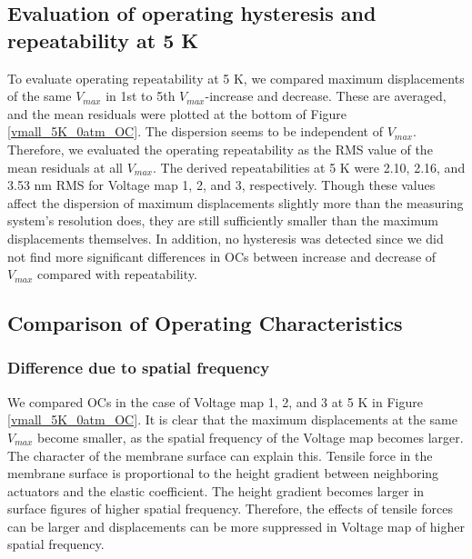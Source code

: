 \documentclass[a4paper]{article}
\begin{document}
\subsection{Evaluation of operating hysteresis and repeatability at 5 K}
\label{repeatability_estimate}
To evaluate operating repeatability at 5 K, we compared maximum displacements of the same $V_{max}$ in 1st to 5th $V_{max}$-increase and decrease. These are averaged, and the mean residuals were plotted at the bottom of Figure \ref{vmall_5K_0atm_OC}. The dispersion seems to be independent of $V_{max}$. Therefore, we evaluated the operating repeatability as the RMS value of the mean residuals at all $V_{max}$. The derived repeatabilities at 5 K were 2.10, 2.16, and 3.53 nm RMS for Voltage map 1, 2, and 3, respectively. Though these values affect the dispersion of maximum displacements slightly more than the measuring system's resolution does, they are still sufficiently smaller than the maximum displacements themselves. In addition, no hysteresis was detected since we did not find more significant differences in OCs between increase and decrease of $V_{max}$ compared with repeatability.

\subsection{Comparison of Operating Characteristics}

\subsubsection{Difference due to spatial frequency}
\label{spacial_frequency}
We compared OCs in the case of Voltage map 1, 2, and 3 at 5 K in Figure \ref{vmall_5K_0atm_OC}. It is clear that the maximum displacements at the same $V_{max}$ become smaller, as the spatial frequency of the Voltage map becomes larger. The character of the membrane surface can explain this. Tensile force in the membrane surface is proportional to the height gradient between neighboring actuators and the elastic coefficient. The height gradient becomes larger in surface figures of higher spatial frequency. Therefore, the effects of tensile forces can be larger and displacements can be more suppressed in Voltage map of higher spatial frequency.
\end{document}
